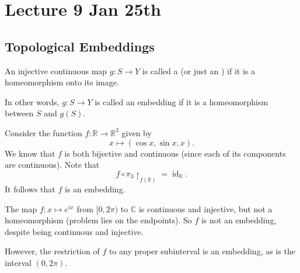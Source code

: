 \documentclass[notoc,notitlepage]{tufte-book}
\DeclareMathOperator{\id}{id}
\begin{document}


\chapter{Lecture 9 Jan 25th}%
\label{chp:lecture_9_jan_25th}

\section{Topological Embeddings}%
\label{sec:topological_embeddings}

\begin{defn}\label{defn:topological_embedding}
  An injective continuous map $g : S \to Y$ is called a  (or just
  an ) if it is a homeomorphism onto its image.
\end{defn}

\begin{note}
  In other words, $g : S \to Y$ is called an embedding if it is a homeomorphism between $S$ and
  $g(S)$.
\end{note}

\begin{eg}
  Consider the function $f : \mathbb{R} \to \mathbb{R}^3$ given by
  \begin{equation*}
    x \mapsto (\cos x, \sin x, x).
  \end{equation*}
  We know that $f$ is both bijective and continuous (since each of its components are continuous).
  Note that
  \begin{equation*}
    f \circ \pi_3 \restriction_{f(\mathbb{R})} = \id_{\mathbb{R}}.
  \end{equation*}
  It follows that $f$ is an embedding.
\end{eg}

\begin{eg}
  The map $f : x \mapsto e^{ix}$ from $[0, 2 \pi)$ to $\mathbb{C}$ is continuous and injective, but
  not a homeomorphism (problem lies on the endpoints). So $f$ is not an embedding, despite being
  continuous and injective.

  However, the restriction of $f$ to any proper subinterval is an embedding, as is the interval
  $(0, 2 \pi)$.
\end{eg}
\end{document}
